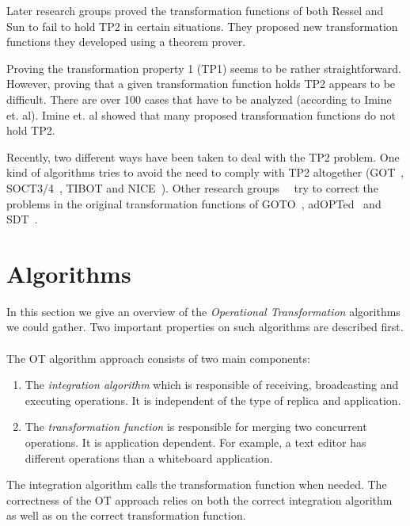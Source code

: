 \documentclass[11pt,a4paper]{article}
\begin{document}
Later research groups\cite{imine03}\cite{imine04} proved the transformation functions of both Ressel\cite{ressel96} and Sun\cite{sun98a} to fail to hold TP2 in certain situations. They proposed new transformation functions they developed using a theorem prover. 

Proving the transformation property 1 (TP1) seems to be rather straightforward. However, proving that a given transformation function holds TP2 appears to be difficult. There are over 100 cases that have to be analyzed (according to {Imine et. al}\cite{imine04}). Imine et. al showed that many proposed transformation functions do not hold TP2. 

Recently, two different ways have been taken to deal with the TP2 problem. One kind of algorithms tries to avoid the need to comply with TP2 altogether (GOT~\cite{sun98a}, SOCT3/4~\cite{suleiman00}, TIBOT\cite{tibot} and NICE~\cite{sun02}). Other research groups~\cite{li04}~\cite{imine04} try to correct the problems in the original transformation functions of GOTO~\cite{sun98b}, adOPTed~\cite{ressel96} and SDT~\cite{sdt}. 


\section{Algorithms}
\label{algos}
In this section we give an overview of the \emph{Operational Transformation} algorithms we could gather. Two important properties on such algorithms are described first.

\paragraph{} The OT algorithm approach consists of two main components:

\begin{enumerate}
 \item The \emph{integration algorithm} which is responsible of receiving, broadcasting and executing operations. It is independent of the type of replica and application.
 \item The \emph{transformation function} is responsible for merging two concurrent operations. It is application dependent. For example, a text editor has different operations than a whiteboard application.
\end{enumerate}

The integration algorithm calls the transformation function when needed. The correctness of the OT approach relies on both the correct integration algorithm as well as on the correct transformation function.
\end{document}
